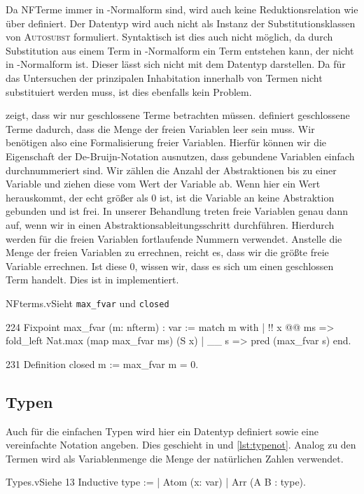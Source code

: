 Da NFTerme immer in \tbeta-Normalform sind, wird auch keine Reduktionsrelation wie  über  definiert. Der Datentyp  wird auch nicht als Instanz der Substitutionsklassen von \textsc{Autosubst} formuliert. Syntaktisch ist dies auch nicht möglich, da durch Substitution aus einem Term in \tbeta-Normalform ein Term entstehen kann, der nicht in \tbeta-Normalform ist. Dieser lässt sich nicht mit dem Datentyp  darstellen. Da für das Untersuchen der prinzipalen Inhabitation innerhalb von Termen nicht substituiert werden muss, ist dies ebenfalls kein Problem.

 zeigt, dass wir nur geschlossene Terme betrachten müssen.  definiert geschlossene Terme dadurch, dass die Menge der freien Variablen leer sein muss. Wir benötigen also eine Formalisierung freier Variablen. Hierfür können wir die Eigenschaft der De-Bruijn-Notation ausnutzen, dass gebundene Variablen einfach durchnummeriert sind. Wir zählen die Anzahl der Abstraktionen bis zu einer Variable und ziehen diese vom Wert der Variable ab. Wenn hier ein Wert herauskommt, der echt größer als $0$ ist, ist die Variable an keine Abstraktion gebunden und ist frei. In unserer Behandlung treten freie Variablen genau dann auf, wenn wir in einen Abstraktionsableitungsschritt durchführen. Hierdurch werden für die freien Variablen fortlaufende Nummern verwendet. Anstelle die Menge der freien Variablen zu errechnen, reicht es, dass wir die größte freie Variable errechnen. Ist diese $0$, wissen wir, dass es sich um einen geschlossen Term handelt. Dies ist in  implementiert.
\begin{multicode}[closed]{NFterms.v}{Sieht }{\texttt{max\_fvar} und \texttt{closed}}
    \begin{mcode}{224}
Fixpoint max_fvar (m: nfterm) : var :=
  match m with
  | !! x @@ ms => fold_left Nat.max (map max_fvar ms) (S x)
  | \__ s => pred (max_fvar s)
  end.
    \end{mcode}
    \begin{mcode}{231}
Definition closed m := max_fvar m = 0.    
    \end{mcode}
\end{multicode}

\subsection{Typen}
Auch für die einfachen Typen wird hier ein Datentyp definiert sowie eine vereinfachte Notation angeben. Dies geschieht in  und \ref{lst:typenot}.
Analog zu den Termen wird als Variablenmenge die Menge der natürlichen Zahlen verwendet.
\begin{code}[type]{Types.v}{Siehe }{13}
Inductive type :=
  | Atom (x: var)
  | Arr (A B : type).
\end{code}

